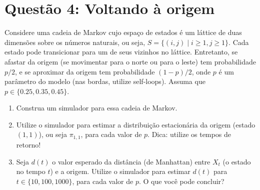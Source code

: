 \section*{Questão 4: Voltando à origem}
Considere uma cadeia de Markov cujo espaço de estados é um láttice de duas dimensões sobre os números naturais, ou seja, $S = \{(i, j) \mid i \geq 1, j \geq 1\}$. Cada estado pode transicionar para um de seus vizinhos no láttice. Entretanto, se afastar da origem (se movimentar para o norte ou para o leste) tem probabilidade $p/2$, e se aproximar da origem tem probabilidade $(1-p)/2$, onde $p$ é um parâmetro do modelo (nas bordas, utilize self-loops). Assuma que $p \in \{0.25, 0.35, 0.45\}$.

\begin{enumerate}
    \item Construa um simulador para essa cadeia de Markov.
    \begin{resposta}

    \end{resposta}
    \item Utilize o simulador para estimar a distribuição estacionária da origem (estado $(1,1)$), ou seja $\pi_{1,1}$, para cada valor de $p$. Dica: utilize os tempos de retorno!
    \begin{resposta}

    \end{resposta}
    \item Seja $d(t)$ o valor esperado da distância (de Manhattan) entre $X_t$ (o estado no tempo $t$) e a origem. Utilize o simulador para estimar $d(t)$ para $t \in \{10, 100, 1000\}$, para cada valor de $p$. O que você pode concluir?
    \begin{resposta}

    \end{resposta}
\end{enumerate}